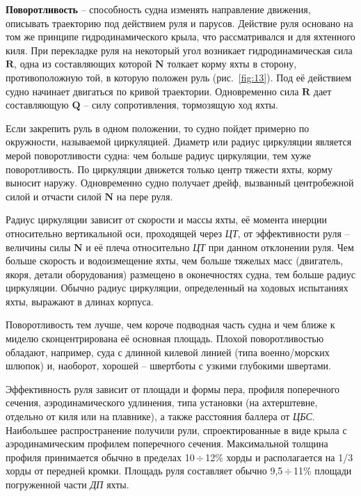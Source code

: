 \documentclass[a4paper, 12pt, twoside, final, book, russian, fittopage, cyremdash]{ncc}
\newcommand{\ve}[1]{\ensuremath{\mathbf{#1}}\xspace}
\newcommand{\otdo}{\,\ensuremath{\div}\,}
\begin{document}
\textbf{Поворотливость} \--- способность судна изменять направление движения, описывать траекторию под действием руля и парусов. Действие руля основано на том же принципе гидродинамического крыла, что рассматривался и для яхтенного киля. При перекладке руля на некоторый угол возникает гидродинамическая сила \ve R, одна из составляющих которой \ve N толкает корму яхты в сторону, противоположную той, в которую положен руль (рис.~\ref{fig:13}). Под её действием судно начинает двигаться по кривой траектории. Одновременно сила \ve R дает составляющую \ve Q \--- силу сопротивления, тормозящую ход яхты.

Если закрепить руль в одном положении, то судно пойдет примерно по окружности, называемой циркуляцией. Диаметр или радиус циркуляции является мерой поворотливости судна: чем больше радиус циркуляции, тем хуже поворотливость. По циркуляции движется только центр тяжести яхты, корму выносит наружу. Одновременно судно получает дрейф, вызванный центробежной силой и отчасти силой \ve N на пере руля.

Радиус циркуляции зависит от скорости и массы яхты, её момента инерции относительно вертикальной оси, проходящей через \textit{ЦТ}, от эффективности руля \--- величины силы \ve N и её плеча относительно \textit{ЦТ} при данном отклонении руля. Чем больше скорость и водоизмещение яхты, чем больше тяжелых масс (двигатель, якоря, детали оборудования) размещено в оконечностях судна, тем больше радиус циркуляции. Обычно радиус циркуляции, определенный на ходовых испытаниях яхты, выражают в длинах корпуса.

Поворотливость тем лучше, чем короче подводная часть судна и чем ближе к миделю сконцентрирована её основная площадь. Плохой поворотливостью обладают, например, суда с длинной килевой линией (типа военно\-/морских шлюпок) и, наоборот, хорошей \--- швертботы с узкими глубокими швертами. 

Эффективность руля зависит от площади и формы пера, профиля поперечного сечения, аэродинамического удлинения, типа установки (на ахтерштевне, отдельно от киля или на плавнике), а также расстояния баллера от \textit{ЦБС}. Наибольшее распространение получили рули, спроектированные в виде крыла с аэродинамическим профилем поперечного сечения. Максимальной толщина профиля принимается обычно в пределах 10\otdo 12\% хорды и располагается на 1/3 хорды от передней кромки. Площадь руля составляет обычно 9,5\otdo 11\% площади погруженной части \textit{ДП} яхты. 
\end{document}
